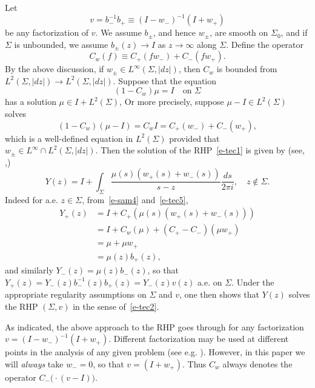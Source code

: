 \documentclass{amsart}
\theoremstyle{definition}
\theoremstyle{remark}
\numberwithin{equation}{section}
\begin{document}
Let 
\begin{equation}\label{e-sam2}
    v=b^{-1}_-b_+ \equiv (I-w_-)^{-1}(I+w_+)
\end{equation}
be any factorization of $v$.
We assume $b_\pm$, and hence $w_\pm$, are smooth on $\Sigma_0$, and 
if $\Sigma$ is unbounded, we assume $b_\pm(z)\to I$ as $z\to\infty$ 
along $\Sigma$.
Define the operator
\begin{equation}\label{e-tec3}
   C_w(f)\equiv C_+(fw_-)+C_-(fw_+).  
\end{equation}
By the above discussion, if $w_\pm\in L^{\infty}(\Sigma,|dz|)$, then 
$C_w$ is bounded from $L^2(\Sigma,|dz|)\to L^2(\Sigma,|dz|)$.
Suppose that the equation 
\begin{equation}\label{e-sam4}
   (1-C_w)\mu=I \quad\text{on $\Sigma$}
\end{equation}
has a solution $\mu\in I+L^2(\Sigma)$,
Or more precisely, suppose $\mu-I\in L^2(\Sigma)$ solves 
\begin{equation}\label{e-tec4}
   (1-C_w)(\mu-I)=C_wI=C_+(w_-)+C_-(w_+),
\end{equation}
which is a well-defined 
equation in $L^2(\Sigma)$ provided that 
$w_\pm\in L^\infty\cap L^2(\Sigma,|dz|)$.
Then the solution of the RHP~\eqref{e-tec1} is given by 
(see, \cite{CG},\cite{BC}) 
\begin{equation}\label{e-sam5}
   Y(z)=I+\int_{\Sigma} \frac{\mu(s)(w_+(s)+w_-(s))}{s-z}
\frac{ds}{2\pi i}, \quad z\notin\Sigma.
\end{equation}
Indeed for a.e. $z\in\Sigma$, from~\eqref{e-sam4} and~\eqref{e-tec5}, 
\begin{equation*}
  \begin{split}
     Y_+(z)&=I+C_+(\mu(s)(w_+(s)+w_-(s)))\\
     &=I+C_w(\mu) + (C_+-C_-)(\mu w_+)\\
     &=\mu+\mu w_+\\
     &=\mu(z)b_+(z),
  \end{split}
\end{equation*}
and similarly $Y_-(z)=\mu(z)b_-(z)$, so that $Y_+(z)=Y_-(z)b_-^{-1}(z)b_+(z)
=Y_-(z)v(z)$ a.e. on $\Sigma$.
Under the appropriate regularity assumptions on $\Sigma$ and $v$, 
one then shows that $Y(z)$ solves the RHP $(\Sigma, v)$ 
in the sense of~\eqref{e-tec2}.

As indicated, the above approach to the RHP goes through for any 
factorization $v=(I-w_-)^{-1}(I+w_+)$. 
Different factorization may be used at different points in the 
analysis of any given problem (see e.g. \cite{DZ1}).
However, in this paper we will \emph{always} take $w_-=0$, so that 
$v=(I+w_+)$.
Thus $C_w$ always denotes the operator $C_-\bigl(\cdot(v-I) \bigr)$.
\end{document}
